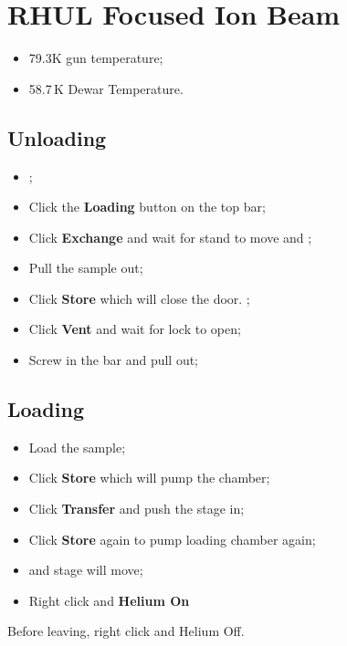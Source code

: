 \section{RHUL Focused Ion Beam}

\begin{framed}\noindent
  \begin{itemize}
  \item 79.3K gun temperature;
  \item 58.7\,K Dewar Temperature.
  \end{itemize}
\end{framed}

\subsection{Unloading}

\begin{itemize}
\item {};
\item Click the \textbf{Loading} button on the top bar;
\item Click \textbf{Exchange} and wait for stand to move and ;
\item Pull the sample out;
\item Click \textbf{Store} which will close the door. ;
\item Click \textbf{Vent} and wait for lock to open;
\item Screw in the bar and pull out;
\end{itemize}

\subsection{Loading}
\begin{itemize}
\item Load the sample;
\item Click \textbf{Store} which will pump the chamber;
\item Click \textbf{Transfer} and push the stage in;
\item Click \textbf{Store} again to pump loading chamber again;
\item {} and stage will move;
\item Right click and \textbf{Helium On}
\end{itemize}

\begin{framed}\noindent
  Before leaving, right click and Helium Off.
\end{framed}

